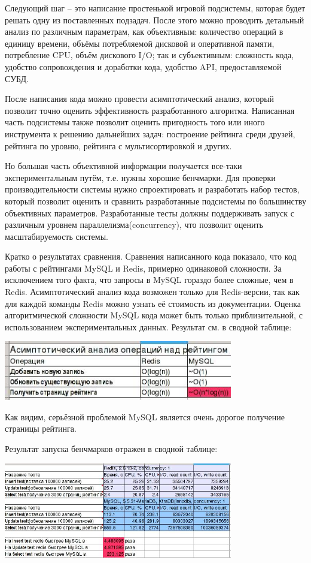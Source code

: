\documentclass[10pt, a5paper]{article}
\begin{document}
Следующий шаг -- это написание простенькой игровой подсистемы, которая будет решать одну из поставленных подзадач. После этого можно проводить детальный анализ по различным параметрам, как объективным: количество операций в единицу времени, объёмы потребляемой дисковой и оперативной памяти, потребление CPU, объём дискового I/O; так и субъективным:  сложность кода, удобство сопровождения и доработки кода, удобство API, предоставляемой СУБД.

После написания кода можно провести асимптотический анализ, который позволит точно оценить эффективность разработанного алгоритма. Написанная часть подсистемы также позволит оценить пригодность того или иного инструмента к решению дальнейших задач: построение рейтинга среди друзей, рейтинга по уровню, рейтинга с мультисортировкой и других.

Но большая часть объективной информации получается все-таки экспериментальным путём, т.е. нужны хорошие бенчмарки. Для проверки производительности системы нужно  спроектировать и разработать набор тестов, который позволит оценить и сравнить разработанные подсистемы по большинству объективных параметров. Разработанные тесты должны поддерживать запуск с различным уровнем параллелизма(concurrency), что позволит оценить масштабируемость системы.

Кратко о результатах сравнения. Сравнения написанного кода показало, что код работы с рейтингами MySQL и Redis, примерно одинаковой сложности. За исключением того факта, что запросы в MySQL гораздо более сложные, чем в Redis. Асимптотический анализ кода возможен только для Redis-версии, так как для каждой команды Redis можно узнать её стоимость из документации. Оценка алгоритмической сложности MySQL кода может быть только приблизительной, с использованием экспериментальных данных. Результат см. в сводной таблице:

\includegraphics[width=10cm]{19_big_o_small.jpeg}

Как видим, серьёзной проблемой MySQL является очень дорогое получение страницы рейтинга.

Результат запуска бенчмарков отражен в сводной таблице:

\includegraphics[width=10cm]{19_table_small.jpeg}
\end{document}
